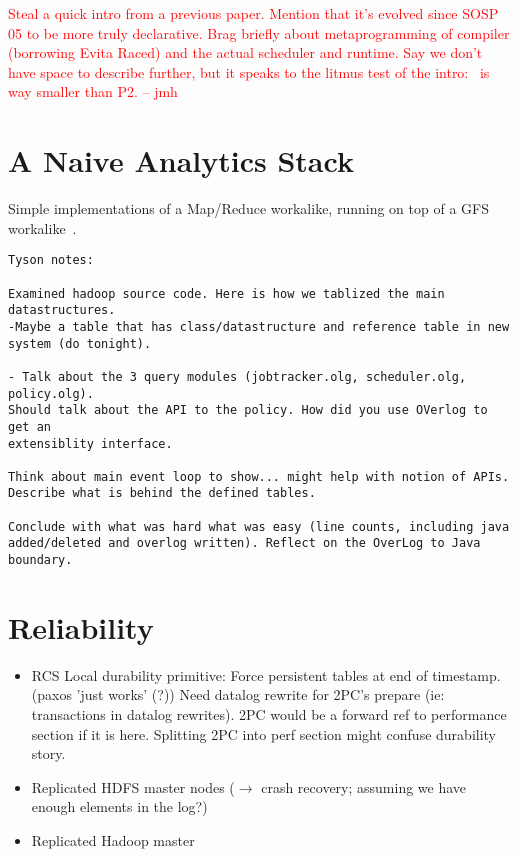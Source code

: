 \documentclass{sig-alternate}
\newcommand{\jmh}[1]{{\textcolor{red}{#1 -- jmh}}}
\begin{document}
\jmh{Steal a quick intro from a previous paper.  Mention that it's evolved since SOSP 05 to be more truly declarative.  Brag briefly about metaprogramming of compiler (borrowing Evita Raced) and the actual scheduler and runtime.  Say we don't have space to describe further, but it speaks to the litmus test of the intro: \JOL\ is way smaller than P2.}
\section{A Naive Analytics Stack}
Simple implementations of a Map/Reduce workalike, running on top of a
GFS workalike~\cite{gfs-sosp}.
\begin{verbatim}
Tyson notes:

Examined hadoop source code. Here is how we tablized the main datastructures. 
-Maybe a table that has class/datastructure and reference table in new system (do tonight).

- Talk about the 3 query modules (jobtracker.olg, scheduler.olg, policy.olg).
Should talk about the API to the policy. How did you use OVerlog to get an
extensiblity interface.

Think about main event loop to show... might help with notion of APIs. Describe what is behind the defined tables.

Conclude with what was hard what was easy (line counts, including java added/deleted and overlog written). Reflect on the OverLog to Java boundary. 
\end{verbatim}

\section{Reliability}
\begin{itemize}
\item
  RCS Local durability primitive: Force persistent tables at end of
  timestamp.  (paxos 'just works' (?)) Need datalog rewrite for 2PC's
  prepare (ie: transactions in datalog rewrites).  2PC would be a
  forward ref to performance section if it is here.  Splitting 2PC
  into perf section might confuse durability story.

\item
  Replicated HDFS master nodes ($\to$ crash recovery; assuming we have
  enough elements in the log?)

\item
  Replicated Hadoop master

\end{itemize}
\end{document}
